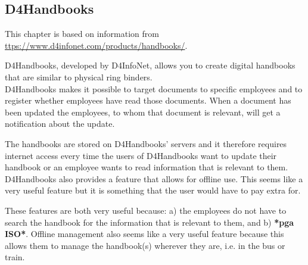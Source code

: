 \subsection{D4Handbooks}
This chapter is based on information 
from \url{ttps://www.d4infonet.com/products/handbooks/}.

D4Handbooks, developed by D4InfoNet, allows you to create digital handbooks that are similar to physical ring binders.\\
D4Handbooks makes it possible to target documents to specific employees and to register whether employees have read those documents. When a document has been updated the employees, to whom that document is relevant, will get a notification about the update.

The handbooks are stored on D4Handbooks' servers and it therefore requires internet access every time the users of D4Handbooks want to update their handbook or an employee wants to read information that is relevant to them.\\
D4Handbooks also provides a feature that allows for offline use. This seems like a very useful feature but it is something that the user would have to pay extra for.

These features are both very useful because: a) the employees do not have to search the handbook for the information that is relevant to them, and b) \textbf{*pga ISO*}. 
Offline management also seems like a very useful feature because this allows them to manage the handbook(s) wherever they are, i.e. in the bus or train. 
